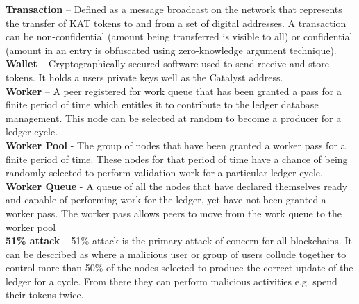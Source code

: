 \textbf{Transaction} – Defined as a message broadcast on the network that represents the transfer of KAT tokens to and from a set of digital addresses. A transaction can be non-confidential (amount being transferred is visible to all) or confidential (amount in an entry is obfuscated using zero-knowledge argument technique). \\

\textbf{Wallet} – Cryptographically secured software used to send receive and store tokens. It holds a users private keys well as the Catalyst address.\\

\textbf{Worker} – A peer registered for work queue that has been granted a pass for a finite period of time which entitles it to contribute to the ledger database management. This node can be selected at random to become a producer for a ledger cycle. \\

\textbf{Worker Pool} - The group of nodes that have been granted a worker pass for a finite period of time. These nodes for that period of time have a chance of being randomly selected to perform validation work for a particular ledger cycle. \\

\textbf{Worker Queue} - A queue of all the nodes that have declared themselves ready and capable of performing work for the ledger, yet have not been granted a worker pass. The worker pass allows peers to move from the work queue to the worker pool\\

\textbf{51\% attack} – 51\% attack is the primary attack of concern for all blockchains. It can be described as where a malicious user or group of users collude together to control more than 50\% of the nodes selected to produce the correct update of the ledger for a cycle. From there they can perform malicious activities e.g. spend their tokens twice. \\
